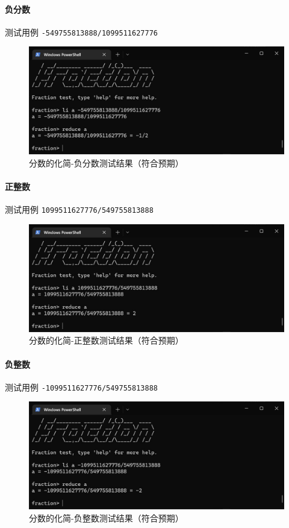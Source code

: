 \documentclass[cn,black,12pt,normal]{elegantnote}
\begin{document}
\paragraph{负分数} 测试用例 \lstinline{-549755813888/1099511627776}
\begin{figure}[H]
    \centering
    \includegraphics[width=.8\textwidth]{imgs/test_reduce_negative_frac.jpg}
    \caption{分数的化简-负分数测试结果（符合预期）}
\end{figure}

\paragraph{正整数} 测试用例 \lstinline{1099511627776/549755813888}
\begin{figure}[H]
    \centering
    \includegraphics[width=.8\textwidth]{imgs/test_reduce_positive_int.jpg}
    \caption{分数的化简-正整数测试结果（符合预期）}
\end{figure}

\paragraph{负整数} 测试用例 \lstinline{-1099511627776/549755813888}
\begin{figure}[H]
    \centering
    \includegraphics[width=.8\textwidth]{imgs/test_reduce_negative_int.jpg}
    \caption{分数的化简-负整数测试结果（符合预期）}
\end{figure}
\end{document}
